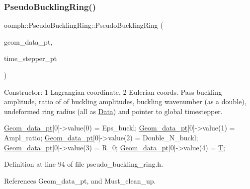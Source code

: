 \subsubsection{\texorpdfstring{Pseudo\+Buckling\+Ring()}{PseudoBucklingRing()}\hspace{0.1cm}{\footnotesize\ttfamily [2/5]}}
{\footnotesize\ttfamily oomph\+::\+Pseudo\+Buckling\+Ring\+::\+Pseudo\+Buckling\+Ring (\begin{DoxyParamCaption}\item[{const \hyperlink{classoomph_1_1Vector}{Vector}$<$ \hyperlink{classoomph_1_1Data}{Data} $\ast$$>$ \&}]{geom\+\_\+data\+\_\+pt,  }\item[{\hyperlink{classoomph_1_1TimeStepper}{Time\+Stepper} $\ast$}]{time\+\_\+stepper\+\_\+pt }\end{DoxyParamCaption})\hspace{0.3cm}{\ttfamily [inline]}}



Constructor\+: 1 Lagrangian coordinate, 2 Eulerian coords. Pass buckling amplitude, ratio of of buckling amplitudes, buckling wavenumber (as a double), undeformed ring radius (all as \hyperlink{classoomph_1_1Data}{Data}) and pointer to global timestepper. 


\begin{DoxyCode}
\hyperlink{classoomph_1_1PseudoBucklingRing_a6d7d859995d19d6dbcd13f444fb73d6a}{Geom\_data\_pt}[0]->value(0) = Eps\_buckl;
\hyperlink{classoomph_1_1PseudoBucklingRing_a6d7d859995d19d6dbcd13f444fb73d6a}{Geom\_data\_pt}[0]->value(1) = Ampl\_ratio;
\hyperlink{classoomph_1_1PseudoBucklingRing_a6d7d859995d19d6dbcd13f444fb73d6a}{Geom\_data\_pt}[0]->value(2) = Double\_N\_buckl;
\hyperlink{classoomph_1_1PseudoBucklingRing_a6d7d859995d19d6dbcd13f444fb73d6a}{Geom\_data\_pt}[0]->value(3) = R\_0;
\hyperlink{classoomph_1_1PseudoBucklingRing_a6d7d859995d19d6dbcd13f444fb73d6a}{Geom\_data\_pt}[0]->value(4) = \hyperlink{classoomph_1_1PseudoBucklingRing_af53f509aa119f74c77ae45046023f28f}{T};
\end{DoxyCode}
 

Definition at line 94 of file pseudo\+\_\+buckling\+\_\+ring.\+h.



References Geom\+\_\+data\+\_\+pt, and Must\+\_\+clean\+\_\+up.

\mbox{\label{classoomph_1_1PseudoBucklingRing_a5569f859a21fc3ce498096397822fe47}} 

